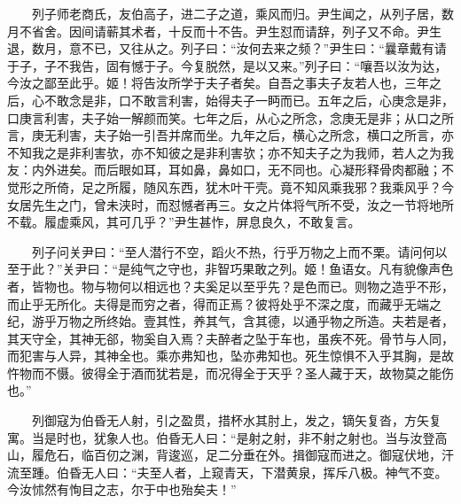 　　列子师老商氏，友伯高子，进二子之道，乘风而归。尹生闻之，从列子居，数月不省舍。因间请蕲其术者，十反而十不告。尹生怼而请辞，列子又不命。尹生退，数月，意不已，又往从之。列子曰：``汝何去来之频？''尹生曰：``曩章戴有请于子，子不我告，固有憾于子。今复脱然，是以又来。''列子曰：``嚷吾以汝为达，今汝之鄙至此乎。姬！将告汝所学于夫子者矣。自吾之事夫子友若人也，三年之后，心不敢念是非，口不敢言利害，始得夫子一眄而已。五年之后，心庚念是非，口庚言利害，夫子始一解颜而笑。七年之后，从心之所念，念庚无是非；从口之所言，庚无利害，夫子始一引吾并席而坐。九年之后，横心之所念，横口之所言，亦不知我之是非利害欤，亦不知彼之是非利害欤；亦不知夫子之为我师，若人之为我友：内外进矣。而后眼如耳，耳如鼻，鼻如口，无不同也。心凝形释骨肉都融；不觉形之所倚，足之所履，随风东西，犹木叶干壳。竟不知风乘我邪？我乘风乎？今女居先生之门，曾未浃时，而怼憾者再三。女之片体将气所不受，汝之一节将地所不载。履虚乘风，其可几乎？''尹生甚怍，屏息良久，不敢复言。

　　列子问关尹曰：``至人潜行不空，蹈火不热，行乎万物之上而不栗。请问何以至于此？''关尹曰：``是纯气之守也，非智巧果敢之列。姬！鱼语女。凡有貌像声色者，皆物也。物与物何以相远也？夫奚足以至乎先？是色而已。则物之造乎不形，而止乎无所化。夫得是而穷之者，得而正焉？彼将处乎不深之度，而藏乎无端之纪，游乎万物之所终始。壹其性，养其气，含其德，以通乎物之所造。夫若是者，其天守全，其神无郤，物奚自入焉？夫醉者之坠于车也，虽疾不死。骨节与人同，而犯害与人异，其神全也。乘亦弗知也，坠亦弗知也。死生惊惧不入乎其胸，是故忤物而不慑。彼得全于酒而犹若是，而况得全于天乎？圣人藏于天，故物莫之能伤也。''

　　列御寇为伯昏无人射，引之盈贯，措杯水其肘上，发之，镝矢复沓，方矢复寓。当是时也，犹象人也。伯昏无人曰：``是射之射，非不射之射也。当与汝登高山，履危石，临百仞之渊，背逡巡，足二分垂在外。揖御寇而进之。御寇伏地，汗流至踵。伯昏无人曰：``夫至人者，上窥青天，下潜黄泉，挥斥八极。神气不变。今汝怵然有恂目之志，尔于中也殆矣夫！''

